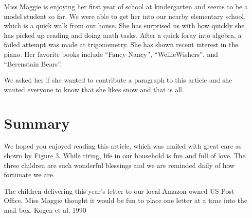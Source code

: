 \documentclass[letterpaper,11pt]{article}
\makeatletter
\newenvironment{figurehere}
  {\def\@captype{figure}}
  {}
\makeatother
\begin{document}
\begin{multicols}{2}
Miss Maggie is enjoying her first year of school at kindergarten and seems to be
a model student so far.  We were able to get her into our nearby elementary school,
which is a quick walk from our house.  She has surprised us with how quickly she
has picked up reading and doing math tasks.  After a quick foray into algebra,
a failed attempt was made at trigonometry.  She has shown recent interest in
the piano. Her favorite books include
\enquote{Fancy Nancy}, \enquote{WellieWishers\texttrademark}, and
\enquote{Berenstain Bears}.

We asked her if she wanted to contribute a paragraph to this article and she wanted
everyone to know that she likes snow and that is all.

\section{Summary}

We hoped you enjoyed reading this article, which was mailed with great care
as shown by Figure 3.  While tiring, life in our household is fun and full of
love.  The three children are such wonderful blessings and we are reminded daily of
how fortunate we are. 

\bigskip
\begin{figurehere}
 \centering   
 \caption{The children delivering this year's letter to our local Amazon owned
 US Post Office. Miss Maggie thought it would be fun to place one letter at 
 a time into the mail box. \textsection \hspace{3pt} Kogen et al. 1990}
\end{figurehere}


\end{multicols}
\end{document}
